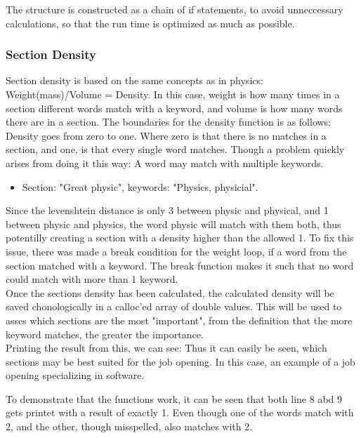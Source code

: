 The structure is constructed as a chain of if statements, to avoid unneccessary
calculations, so that the run time is optimized as much as possible.
\subsubsection{Section Density}
Section density is based on the same concepts as in physics: Weight(mass)/Volume = Density.
In this case, weight is how many times in a section different words match with a keyword, and volume is how many words there
are in a section. The boundaries for the density function is as follows: Density goes from zero to one. 
Where zero is that there is no matches in a section, and one, is that every single word matches. Though a problem quickly arises
from doing it this way: A word may match with multiple keywords.
\begin{itemize}
  \item Section: "Great physic", keywords: "Physics, physicial".
\end{itemize}
Since the levenshtein distance is only 3 between physic and physical, and 1 between physic and physics,
the word physic will match with them both, thus potentilly creating a section with a density higher than the allowed 1.
To fix this issue, there was made a break condition for the weight loop, if a word from the section matched with a keyword.
The break function makes it such that no word could match with more than 1 keyword.
\\
Once the sections density has been calculated, the calculated density will be saved chonologically in a calloc'ed array of double values. 
This will be used to asses which sections are the most "important", from the definition that the more keyword matches, the greater the importance.
\\
Printing the result from this, we can see:
Thus it can easily be seen, which sections may be best suited for the job opening. 
In this case, an example of a job opening specializing in software.

To demonstrate that the functions work, it can be seen that both line 8 abd 9 gets printet with a result of exactly 1.
Even though one of the words match with 2, and the other, though misspelled, also matches with 2.

